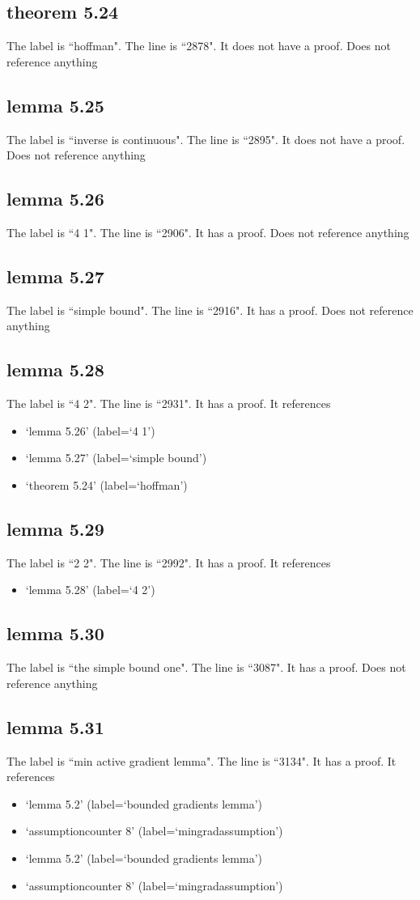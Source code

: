 \documentclass{article}
\begin{document}
\subsection{theorem 5.24}
The label is ``hoffman".
The line is ``2878".
It does not have a proof.
Does not reference anything
\subsection{lemma 5.25}
The label is ``inverse is continuous".
The line is ``2895".
It does not have a proof.
Does not reference anything
\subsection{lemma 5.26}
The label is ``4 1".
The line is ``2906".
It has a proof.
Does not reference anything
\subsection{lemma 5.27}
The label is ``simple bound".
The line is ``2916".
It has a proof.
Does not reference anything
\subsection{lemma 5.28}
The label is ``4 2".
The line is ``2931".
It has a proof.
It references \begin{itemize}
\item `lemma 5.26' (label=`4 1')
\item `lemma 5.27' (label=`simple bound')
\item `theorem 5.24' (label=`hoffman')
\end{itemize}
\subsection{lemma 5.29}
The label is ``2 2".
The line is ``2992".
It has a proof.
It references \begin{itemize}
\item `lemma 5.28' (label=`4 2')
\end{itemize}
\subsection{lemma 5.30}
The label is ``the simple bound one".
The line is ``3087".
It has a proof.
Does not reference anything
\subsection{lemma 5.31}
The label is ``min active gradient lemma".
The line is ``3134".
It has a proof.
It references \begin{itemize}
\item `lemma 5.2' (label=`bounded gradients lemma')
\item `assumptioncounter 8' (label=`mingradassumption')
\item `lemma 5.2' (label=`bounded gradients lemma')
\item `assumptioncounter 8' (label=`mingradassumption')
\end{itemize}
\end{document}
